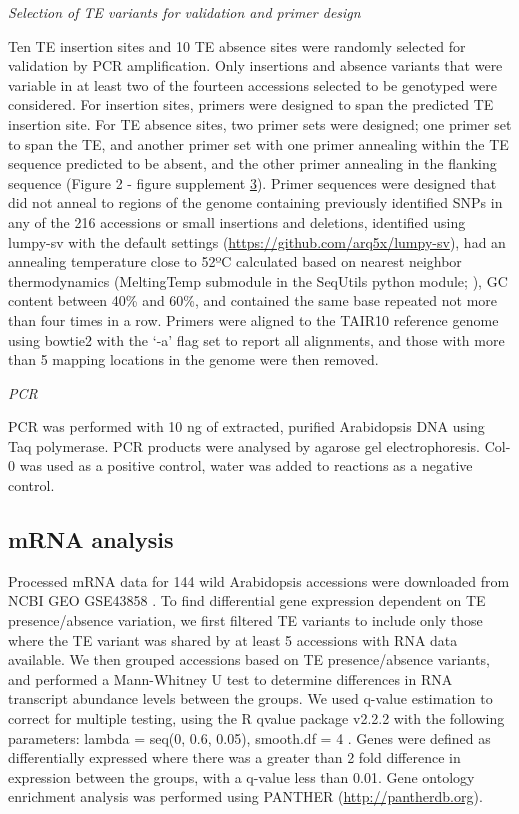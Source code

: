 \documentclass[12pt]{article}
\begin{document}
\emph{Selection of TE variants for validation and primer design}

Ten TE insertion sites and 10 TE absence sites were randomly selected
for validation by PCR amplification. Only insertions and absence
variants that were variable in at least two of the fourteen accessions
selected to be genotyped were considered. For insertion sites, primers
were designed to span the predicted TE insertion site. For TE absence
sites, two primer sets were designed; one primer set to span the TE,
and another primer set with one primer annealing within the TE
sequence predicted to be absent, and the other primer annealing in the
flanking sequence (Figure 2 - figure supplement
\hyperref[fig2s3]{3}). Primer sequences were designed that did not
anneal to regions of the genome containing previously identified SNPs
in any of the 216 accessions \cite{Schmitz:2013iu} or small insertions
and deletions, identified using lumpy-sv with the default settings
\cite{Layer:2014ie}(\url{https://github.com/arq5x/lumpy-sv}), had an
annealing temperature close to 52ºC calculated based on nearest
neighbor thermodynamics (MeltingTemp submodule in the SeqUtils python
module; \cite{Cock:2009hj}), GC content between 40\% and 60\%, and
contained the same base repeated not more than four times in a
row. Primers were aligned to the TAIR10 reference genome using bowtie2
\cite{Langmead:2012jh} with the `-a' flag set to report all
alignments, and those with more than 5 mapping locations in the genome
were then removed.

\emph{PCR}

PCR was performed with 10 ng of extracted, purified Arabidopsis DNA
using Taq polymerase. PCR products were analysed by agarose gel
electrophoresis. Col-0 was used as a positive control, water was added
to reactions as a negative control.

\subsection{mRNA analysis}

Processed mRNA data for 144 wild Arabidopsis accessions were downloaded
from NCBI GEO GSE43858 \cite{Schmitz:2013iu}. To find differential gene
expression dependent on TE presence/absence variation, we first filtered
TE variants to include only those where the TE variant was shared by at
least 5 accessions with RNA data available. We then grouped accessions
based on TE presence/absence variants, and performed a Mann-Whitney U
test to determine differences in RNA transcript abundance levels between
the groups. We used q-value estimation to correct for multiple testing,
using the R qvalue package v2.2.2 with the following parameters: lambda
= seq(0, 0.6, 0.05), smooth.df = 4 \cite{Storey:2003cj}. Genes were
defined as differentially expressed where there was a greater than 2
fold difference in expression between the groups, with a q-value less
than 0.01. Gene ontology enrichment analysis was performed using PANTHER
(\url{http://pantherdb.org}).
\end{document}
